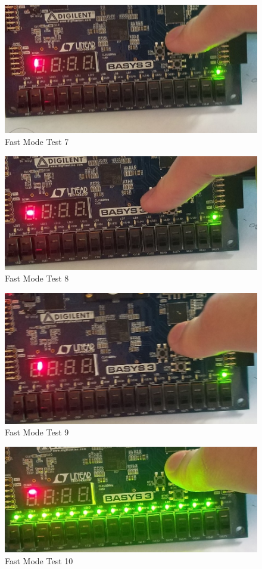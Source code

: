 \documentclass[11pt]{article}
\begin{document}
\begin{figure}[ht]\centering
\includegraphics[width=1.0\textwidth,trim=0 0mm 0 0,clip]{Fast7}
\caption{Fast Mode Test 7}
\end{figure}
\begin{figure}[ht]\centering
\includegraphics[width=1.0\textwidth,trim=0 0mm 0 0,clip]{Fast8}
\caption{Fast Mode Test 8}
\end{figure}
\begin{figure}[ht]\centering
\includegraphics[width=1.0\textwidth,trim=0 0mm 0 0,clip]{Fast9}
\caption{Fast Mode Test 9}
\end{figure}
\begin{figure}[ht]\centering
\includegraphics[width=1.0\textwidth,trim=0 0mm 0 0,clip]{Fast10}
\caption{Fast Mode Test 10}
\end{figure}
\end{document}
